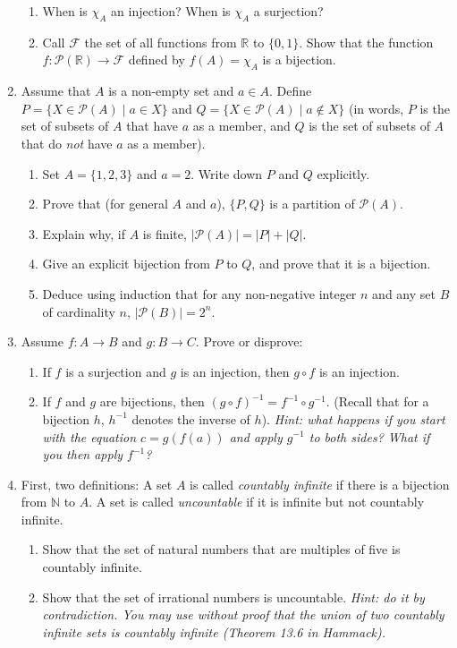 \documentclass{amsart}
\theoremstyle{definition}
\begin{document}
\begin{enumerate}
  \begin{enumerate}
  \item When is $\chi_A$ an injection? When is $\chi_A$ a surjection?
  \item Call $\mathcal{F}$ the set of all functions from $\mathbb{R}$ to $\{0, 1\}$. Show that the function $f: \mathcal{P} (\mathbb{R}) \to \mathcal{F}$ defined by $f (A) = \chi_A$ is a bijection.
  \end{enumerate}
\item
  Assume that $A$ is a non-empty set and $a \in A$. Define $P = \{X \in \mathcal{P} (A) \mid a \in X\}$ and $Q = \{X \in \mathcal{P} (A) \mid a \notin X\}$ (in words, $P$ is the set of subsets of $A$ that have $a$ as a member, and $Q$ is the set of subsets of $A$ that do \emph{not} have $a$ as a member).
    \begin{enumerate}
    \item Set $A = \{1, 2, 3\}$ and $a = 2$. Write down $P$ and $Q$ explicitly.
    \item Prove that (for general $A$ and $a$), $\{P, Q\}$ is a partition of $\mathcal{P} (A)$.
    \item Explain why, if $A$ is finite, $|\mathcal{P} (A)| = |P| + |Q|$.
    \item Give an explicit bijection from $P$ to $Q$, and prove that it is a bijection.
    \item Deduce using induction that for any non-negative integer $n$ and any set $B$ of cardinality $n$, $|\mathcal{P} (B)| = 2^n$.
    \end{enumerate}
\item Assume $f: A \to B$ and $g: B \to C$. Prove or disprove:
  \begin{enumerate}
  \item If $f$ is a surjection and $g$ is an injection, then $g \circ f$ is an injection.
  \item If $f$ and $g$ are bijections, then $(g \circ f)^{-1} = f^{-1} \circ g^{-1}$. (Recall that for a bijection $h$, $h^{-1}$ denotes the inverse of $h$). \emph{Hint: what happens if you start with the equation $c = g (f (a))$ and apply $g^{-1}$ to both sides? What if you then apply $f^{-1}$?}
  \end{enumerate}
\item First, two definitions: A set $A$ is called \emph{countably infinite} if there is a bijection from $\mathbb{N}$ to $A$. A set is called \emph{uncountable} if it is infinite but not countably infinite.

  \begin{enumerate}
  \item Show that the set of natural numbers that are multiples of five is countably infinite.
  \item Show that the set of irrational numbers is uncountable. \emph{Hint: do it by contradiction. You may use without proof that the union of two countably infinite sets is countably infinite (Theorem 13.6 in Hammack).}
  \end{enumerate}
\end{enumerate}



\end{document}
